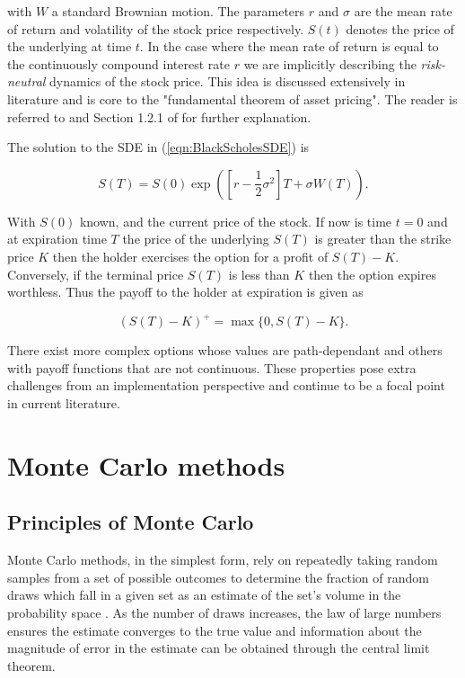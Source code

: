 with \(W\) a standard Brownian motion. The parameters \(r\) and \(\sigma\) are the mean rate of return and volatility of the stock price respectively. $S(t)$ denotes the price of the underlying at time $t$. In the case where the mean rate of return is equal to the continuously compound interest rate \(r\) we are implicitly describing the \textit{risk-neutral} dynamics of the stock price. This idea is discussed extensively in literature and is core to the "fundamental theorem of asset pricing". The reader is referred to \cite{Dybvig2003} and Section 1.2.1 of \cite{glasserman2004monte} for further explanation.

The solution to the SDE in (\ref{eqn:BlackScholesSDE}) is

\begin{equation} \label{eqn:STsolution}
    S(T) = S(0)\exp{([r - \frac{1}{2}\sigma^2]T + \sigma W(T))}.
\end{equation}

With \(S(0)\) known, and the current price of the stock. If now is time \(t=0\) and at expiration time \(T\) the price of the underlying \(S(T)\) is greater than the strike price \(K\) then the holder exercises the option for a profit of \(S(T) - K\). Conversely, if the terminal price \(S(T)\) is less than \(K\) then the option expires worthless. Thus the payoff to the holder at expiration is given as

\begin{equation} \label{eqn:EuropeanCallPayoff}
    (S(T) - K)^+ = \max{\{0, S(T) - K\}}.
\end{equation}

There exist more complex options whose values are path-dependant and others with payoff functions that are not continuous. These properties pose extra challenges from an implementation perspective and continue to be a focal point in current literature.

\section{Monte Carlo methods} \label{sec:MonteCarloMethods}
\subsection{Principles of Monte Carlo} \label{sec:MonteCarloPriciples}
Monte Carlo methods, in the simplest form, rely on repeatedly taking random samples from a set of possible outcomes to determine the fraction of random draws which fall in a given set as an estimate of the set's volume in the probability space \cite{glasserman2004monte}. As the number of draws increases, the law of large numbers ensures the estimate converges to the true value and information about the magnitude of error in the estimate can be obtained through the central limit theorem.

